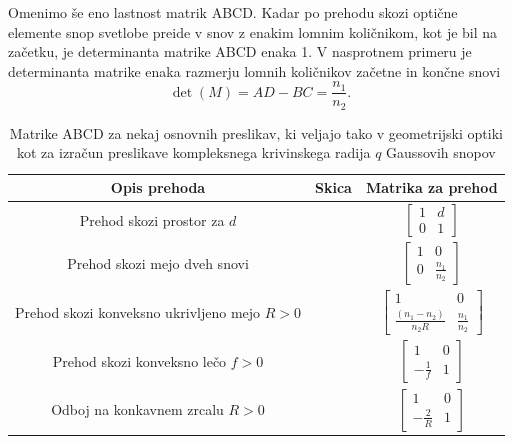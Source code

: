 Omenimo še eno lastnost matrik ABCD. Kadar po prehodu skozi optične elemente snop svetlobe 
preide v snov z enakim lomnim količnikom, kot je bil na začetku, je determinanta matrike 
ABCD enaka 1. V nasprotnem
primeru je determinanta matrike enaka razmerju lomnih količnikov začetne in končne snovi
\begin{equation}
\det(M) = AD-BC = \frac{n_1}{n_2}.
\end{equation}
\newpage
\begin{table}[t!]
 \centering
  \begin{tabular}{|c|c|c|} \hline
  Opis prehoda & Skica & Matrika za prehod \\ \hline   
      Prehod skozi prostor za $d$ & \parbox[c]{3cm}{\def\svgwidth{3cm}} & 
      $\begin{bmatrix} 1 & d\\  0 & 1 \end{bmatrix}$ \\ \hline

      Prehod skozi mejo dveh snovi & \parbox[c]{3cm}{\def\svgwidth{3cm}} & 
      $\begin{bmatrix} 1 & 0\\ 0 & \frac{n_{1}}{n_{2}} \end{bmatrix}$ \\ \hline
      
      Prehod skozi konveksno ukrivljeno mejo $R>0$ & \parbox[c]{3cm}{\def\svgwidth{3cm}} & 
      $\begin{bmatrix} 1 & 0\\ \frac{(n_{1}-n_{2})}{n_{2}R} & \frac{n_{1}}{n_{2}} \end{bmatrix}$ \\ \hline
      
      Prehod skozi konveksno lečo $f>0$ & \parbox[c]{3cm}{\def\svgwidth{3cm}} & 
      $\begin{bmatrix} 1 & 0\\ -\frac{1}{f} & 1 \end{bmatrix}$ \\ \hline
      
      Odboj na konkavnem zrcalu $R>0$ & \parbox[c]{3cm}{\def\svgwidth{3cm}} & 
      $\begin{bmatrix} 1 & 0\\ -\frac{2}{R} & 1 \end{bmatrix}$ \\ \hline    
  \end{tabular}
  \caption{Matrike ABCD za nekaj osnovnih preslikav, ki veljajo tako v 
	  geometrijski optiki kot za izračun preslikave kompleksnega
	  krivinskega radija $q$ Gaussovih snopov}
\label{fig:Matrike-za-preslikave}
\end{table}

